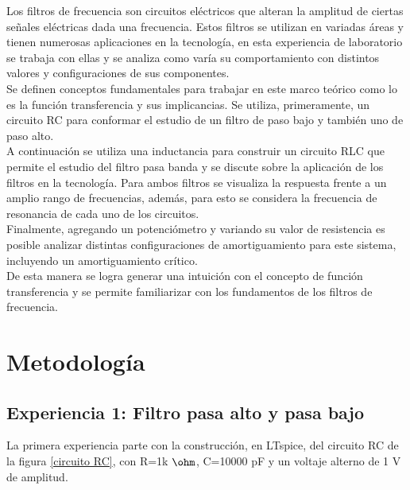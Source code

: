 \documentclass[letterpaper,11pt]{article} %
\begin{document}
	



\begin{resumen}
Los filtros de frecuencia son circuitos eléctricos que alteran la amplitud de ciertas señales eléctricas dada una frecuencia. Estos filtros se utilizan en variadas áreas y tienen numerosas aplicaciones en la tecnología, en esta experiencia de laboratorio se trabaja con ellas y se analiza como varía su comportamiento con distintos valores y configuraciones de sus componentes.\\
Se definen conceptos fundamentales para trabajar en este marco teórico como lo es la función transferencia y sus implicancias. Se utiliza, primeramente, un circuito RC para conformar el estudio de un filtro de paso bajo y también uno de paso alto.\\
A continuación se utiliza una inductancia para construir un circuito RLC que permite el estudio del filtro pasa banda y se discute sobre la aplicación de los filtros en la tecnología. Para ambos filtros se visualiza la respuesta frente a un amplio rango de frecuencias, además, para esto se considera la frecuencia de resonancia de cada uno de los circuitos.\\
Finalmente, agregando un potenciómetro y variando su valor de resistencia es posible analizar distintas configuraciones de amortiguamiento para este sistema, incluyendo un amortiguamiento crítico.\\
De esta manera se logra generar una intuición con el concepto de función transferencia y se permite familiarizar con los fundamentos de los filtros de frecuencia. 

\end{resumen}




\section{Metodología}
\subsection{Experiencia 1: Filtro pasa alto y pasa bajo}
La primera experiencia parte con la construcción, en LTspice, del circuito RC de la figura \ref{circuito RC}, con R=1k $\ohm$, C=10000 pF y un voltaje alterno de 1 V de amplitud. 
    
\end{document}
